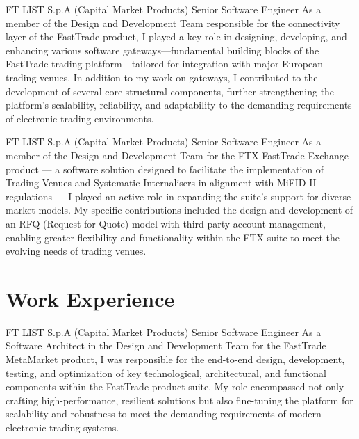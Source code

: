 \documentclass[10pt]{article} %
\begin{document}
\begin{paracol}{2}
{FT} %
{LIST S.p.A (Capital Market Products)} %
{Senior Software Engineer} %
{As a member of the Design and Development Team responsible for the connectivity layer of the FastTrade
product, I played a key role in designing, developing, and enhancing various software gateways—fundamental
building blocks of the FastTrade trading platform—tailored for integration with major European trading venues.
In addition to my work on gateways, I contributed to the development of several core structural components,
further strengthening the platform's scalability, reliability, and adaptability to the demanding requirements
of electronic trading environments.
} %

{FT} %
{LIST S.p.A (Capital Market Products)} %
{Senior Software Engineer} %
{As a member of the Design and Development Team for the FTX-FastTrade Exchange product — a software solution
designed to facilitate the implementation of Trading Venues and Systematic Internalisers in alignment
with MiFID II regulations — I played an active role in expanding the suite's support for diverse market models.
My specific contributions included the design and development of an RFQ (Request for Quote) model with
third-party account management, enabling greater flexibility and functionality within the FTX suite to
meet the evolving needs of trading venues.} %

\switchcolumn
\newpage

\section{Work Experience}

{FT} %
{LIST S.p.A (Capital Market Products)} %
{Senior Software Engineer} %
{As a Software Architect in the Design and Development Team for the FastTrade MetaMarket product, I was responsible
for the end-to-end design, development, testing, and optimization of key technological, architectural,
and functional components within the FastTrade product suite.
My role encompassed not only crafting high-performance, resilient solutions but also fine-tuning the platform
for scalability and robustness to meet the demanding requirements of modern electronic trading systems.} %


\end{paracol}
\end{document}
